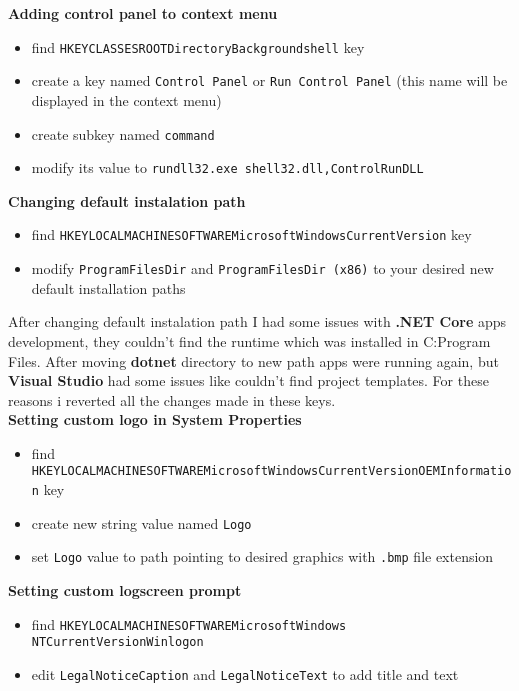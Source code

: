 \textbf{Adding control panel to context menu}
\begin{itemize}
\item find \texttt{HKEY{\us}CLASSES{\us}ROOT{\bs}Directory{\bs}Background{\bs}shell} key
\item create a key named \texttt{Control Panel} or \texttt{Run Control Panel} (this name will be displayed in the context menu)
\item create subkey named \texttt{command}
\item modify its value to \texttt{rundll32.exe shell32.dll,Control{\us}RunDLL}
\end{itemize}

\textbf{Changing default instalation path}

\begin{itemize}
\item find \texttt{HKEY{\us}LOCAL{\us}MACHINE{\bs}SOFTWARE{\bs}Microsoft{\bs}Windows{\bs}CurrentVersion} key
\item modify \texttt{ProgramFilesDir} and \texttt{ProgramFilesDir (x86)} to your desired new default installation paths
\end{itemize}

 After changing default instalation path I had some issues with \textbf{.NET Core} apps development, they couldn't find the runtime which was installed in C:{\bs}Program Files. After moving \textbf{dotnet} directory to new path apps were running again, but \textbf{Visual Studio} had some issues like couldn't find project templates. For these reasons i reverted all the changes made in these keys.\\

\textbf{Setting custom logo in System Properties }
\begin{itemize}
\item find \texttt{HKEY{\us}LOCAL{\us}MACHINE{\us}SOFTWARE{\bs}Microsoft{\bs}Windows{\bs}CurrentVersion{\bs}OEMInformation} key
\item create new string value named \texttt{Logo}
\item set \texttt{Logo} value to path pointing to desired graphics with \texttt{.bmp} file extension
\end{itemize}

\textbf{Setting custom logscreen prompt}
\begin{itemize}
\item find \texttt{HKEY{\us}LOCAL{\us}MACHINE{\bs}SOFTWARE{\bs}Microsoft{\bs}Windows NT{\bs}CurrentVersion{\bs}Winlogon}
\item edit \texttt{LegalNoticeCaption} and \texttt{LegalNoticeText} to add title and text
\end{itemize}
